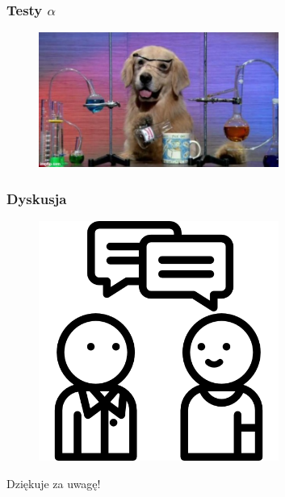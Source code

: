\documentclass[aspectratio=169]{beamer}
\begin{document}
\begin{frame}
	\frametitle{Testy $\alpha$} %
	\begin{figure}
		\centering
		\includegraphics[width=0.7\textwidth]{dog.jpg}
	\end{figure}
\end{frame}


\begin{frame}
	\frametitle{Dyskusja}
	\begin{figure}
		\centering
		\includegraphics[width=0.7\textwidth]{questions.png}
	\end{figure}
\end{frame}

\begin{frame}
	  \begin{center}
	\Huge Dziękuje za uwagę!
	\end{center}
\end{frame}
\end{document}
